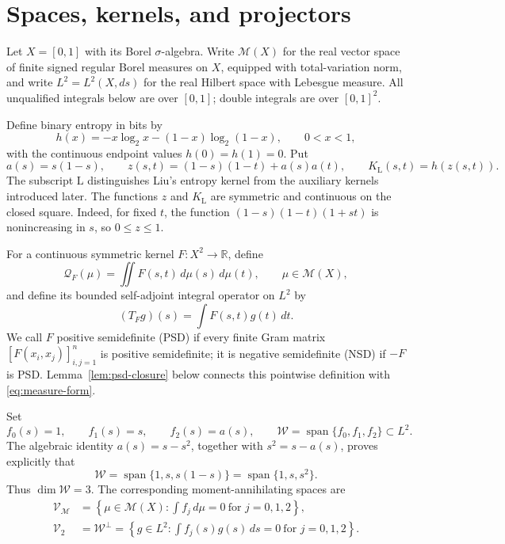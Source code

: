 \documentclass[11pt]{article}
\theoremstyle{plain}
\theoremstyle{definition}
\theoremstyle{remark}
\newcommand{\M}{\mathcal M}
\newcommand{\W}{\mathcal W}
\newcommand{\V}{\mathcal V}
\newcommand{\QF}{\mathcal Q}
\newcommand{\RR}{\mathbb R}
\begin{document}
\section{Spaces, kernels, and projectors}
\label{sec:setup}

Let \(X=[0,1]\) with its Borel \(\sigma\)-algebra.  Write \(\M(X)\) for the
real vector space of finite signed regular Borel measures on \(X\), equipped
with total-variation norm, and write \(L^2=L^2(X,ds)\) for the real Hilbert
space with Lebesgue measure.  All unqualified integrals below are over
\([0,1]\); double integrals are over \([0,1]^2\).

Define binary entropy in bits by
\begin{equation}
  h(x)=-x\log_2x-(1-x)\log_2(1-x),\qquad 0<x<1,
  \label{eq:entropy}
\end{equation}
with the continuous endpoint values \(h(0)=h(1)=0\).  Put
\begin{equation}
  a(s)=s(1-s),\qquad
  z(s,t)=(1-s)(1-t)+a(s)a(t),\qquad
  K_{\mathrm L}(s,t)=h(z(s,t)).
  \label{eq:liu-kernel}
\end{equation}
The subscript \({\mathrm L}\) distinguishes Liu's entropy kernel from the
auxiliary kernels introduced later.  The functions \(z\) and
\(K_{\mathrm L}\) are symmetric and continuous on the closed square.
Indeed, for fixed \(t\), the function
\((1-s)(1-t)(1+st)\) is nonincreasing in \(s\), so \(0\le z\le1\).

For a continuous symmetric kernel \(F:X^2\to\RR\), define
\begin{equation}
  \QF_F(\mu)=\iint F(s,t)\,d\mu(s)\,d\mu(t),
  \qquad \mu\in\M(X),
  \label{eq:measure-form}
\end{equation}
and define its bounded self-adjoint integral operator on \(L^2\) by
\begin{equation}
  (T_Fg)(s)=\int F(s,t)g(t)\,dt.
  \label{eq:integral-operator}
\end{equation}
We call \(F\) positive semidefinite (PSD) if every finite Gram matrix
\([F(x_i,x_j)]_{i,j=1}^n\) is positive semidefinite; it is negative
semidefinite (NSD) if \(-F\) is PSD.  Lemma~\ref{lem:psd-closure} below connects
this pointwise definition with \eqref{eq:measure-form}.

Set
\begin{equation}
  f_0(s)=1,\qquad f_1(s)=s,\qquad f_2(s)=a(s),
  \qquad
  \W=\operatorname{span}\{f_0,f_1,f_2\}\subset L^2.
  \label{eq:constraint-space}
\end{equation}
The algebraic identity \(a(s)=s-s^2\), together with
\(s^2=s-a(s)\), proves explicitly that
\begin{equation}
  \W=\operatorname{span}\{1,s,s(1-s)\}
    =\operatorname{span}\{1,s,s^2\}.
  \label{eq:span-equality}
\end{equation}
Thus \(\dim\W=3\).  The corresponding moment-annihilating spaces are
\begin{align}
  \V_{\M}
  &=\left\{\mu\in\M(X):
      \int f_j\,d\mu=0\ \text{for }j=0,1,2\right\},
      \label{eq:measure-subspace}\\
  \V_2
  &=\W^\perp
   =\left\{g\in L^2:
      \int f_j(s)g(s)\,ds=0\ \text{for }j=0,1,2\right\}.
      \label{eq:l2-subspace}
\end{align}
\end{document}
